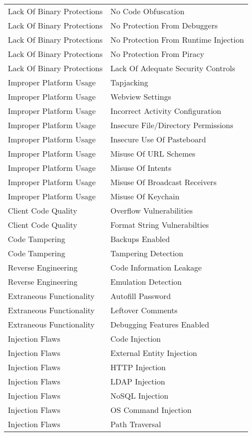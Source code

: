 \begin{longtable}{p{} | p{} }
Lack Of Binary Protections& No Code Obfuscation\\
Lack Of Binary Protections& No Protection From Debuggers\\
Lack Of Binary Protections& No Protection From Runtime Injection\\
Lack Of Binary Protections& No Protection From Piracy\\
Lack Of Binary Protections& Lack Of Adequate Security Controls\\
Improper Platform Usage& Tapjacking\\
Improper Platform Usage& Webview Settings\\
Improper Platform Usage& Incorrect Activity Configuration\\
Improper Platform Usage& Insecure File/Directory Permissions\\
Improper Platform Usage& Insecure Use Of Pasteboard\\
Improper Platform Usage& Misuse Of URL Schemes\\
Improper Platform Usage& Misuse Of Intents\\
Improper Platform Usage& Misuse Of Broadcast Receivers\\
Improper Platform Usage& Misuse Of Keychain\\
Client Code Quality& Overflow Vulnerabilities\\
Client Code Quality& Format String Vulnerabilties\\
Code Tampering& Backups Enabled\\
Code Tampering& Tampering Detection\\
Reverse Engineering& Code Information Leakage\\
Reverse Engineering& Emulation Detection\\
Extraneous Functionality& Autofill Password\\
Extraneous Functionality& Leftover Comments\\
Extraneous Functionality& Debugging Features Enabled\\
Injection Flaws& Code Injection\\
Injection Flaws& External Entity Injection\\
Injection Flaws& HTTP Injection\\
Injection Flaws& LDAP Injection\\
Injection Flaws& NoSQL Injection\\
Injection Flaws& OS Command Injection\\
Injection Flaws& Path Traversal\\

\end{longtable}
